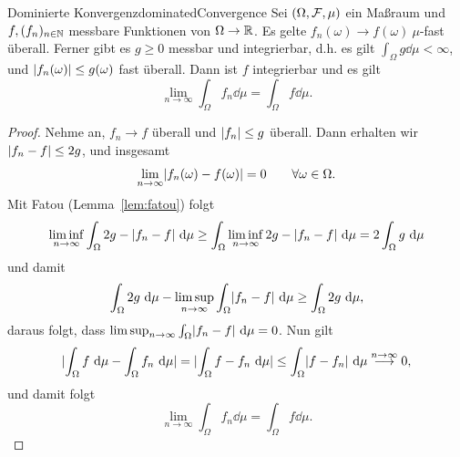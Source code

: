 \documentclass[language=ngerman]{../../Template/TemplateLecture}
\begin{document}
\begin{thm}{Dominierte Konvergenz}{dominatedConvergence}
    Sei $(\Omega, \mathcal{F}, \mu)$ ein Maßraum und $f, (f_n)_{n \in \mathbb{N}}$ messbare Funktionen von $\Omega\to\mathbb{R}$. Es gelte $f_n(\omega) \to f(\omega)~\mu$-fast überall. Ferner gibt es $g \geq 0$ messbar und integrierbar, d.h. es gilt $\int_\Omega g \dd\mu < \infty$, und $\lvert f_n(\omega)\rvert \leq g(\omega)$ fast überall. Dann ist $f$ integrierbar und es gilt  
    \begin{equation}
        \lim_{n \to \infty} \int_\Omega f_n \dd\mu = \int_\Omega f \dd\mu.
    \end{equation}
\end{thm}

\begin{proof}
    Nehme an, $f_n \to f$ überall und $\lvert f_n\rvert \leq g$ überall. Dann erhalten wir $\lvert f_n - f\rvert \leq 2g$, und insgesamt 
    \begin{equation}
        \lim_{n \to \infty} \lvert f_n(\omega) - f(\omega)\rvert = 0 \quad \quad \forall \omega \in \Omega. 
    \end{equation}  
    Mit Fatou (Lemma~\ref{lem:fatou}) folgt 
    \begin{equation}
        \liminf_{n \to \infty} \int_\Omega 2g - \lvert f_n - f\rvert ~\mathrm{d}\mu \geq \int_\Omega \liminf_{n \to \infty} 2g - \lvert f_n - f\rvert ~\mathrm{d}\mu = 2\int_\Omega g ~\mathrm{d}\mu
    \end{equation}
    und damit 
    \begin{equation}
        \int_\Omega 2g ~\mathrm{d}\mu - \limsup_{n \to \infty} \int_\Omega \lvert f_n - f\rvert ~\mathrm{d}\mu \geq \int_\Omega 2g ~\mathrm{d}\mu,
    \end{equation}
    daraus folgt, dass $\limsup_{n \to \infty} \int_\Omega \lvert f_n - f\rvert ~\mathrm{d}\mu = 0$. Nun gilt 
    \begin{equation}
        \lvert\int_\Omega f ~\mathrm{d}\mu - \int_\Omega f_n ~\mathrm{d}\mu\rvert = \lvert\int_\Omega f - f_n ~\mathrm{d}\mu\rvert \leq \int_\Omega \lvert f - f_n\rvert ~\mathrm{d}\mu \overset{n \to \infty}{\longrightarrow} 0,
    \end{equation}
    und damit folgt 
    \begin{equation}
        \lim_{n \to \infty} \int_\Omega f_n \dd\mu = \int_\Omega f\dd\mu.
    \end{equation}


\end{proof}
\end{document}

